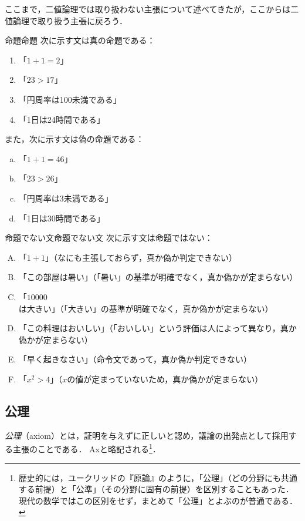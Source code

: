 ここまで，二値論理では取り扱わない主張について述べてきたが，ここからは二値論理で取り扱う主張に戻ろう．

\begin{example}{命題}{命題}
次に示す文は真の命題である：
\begin{enumerate}[(1)]
\item 「$1+1=2$」
\item 「$23 > 17$」
\item 「円周率は100未満である」
\item 「1日は24時間である」
\end{enumerate}
また，次に示す文は偽の命題である：
\begin{enumerate}[(a)]
\item 「$1+1=46$」
\item 「$23>26$」
\item 「円周率は3未満である」
\item 「1日は30時間である」
\end{enumerate}
\end{example}

\begin{example}{命題でない文}{命題でない文}
次に示す文は命題ではない：
\begin{enumerate}[(A)]
\item 「$1+1$」（なにも主張しておらず，真か偽か判定できない）
\item 「この部屋は暑い」（「暑い」の基準が明確でなく，真か偽かが定まらない）
\item 「$10000$は大きい」（「大きい」の基準が明確でなく，真か偽かが定まらない）
\item 「この料理はおいしい」（「おいしい」という評価は人によって異なり，真か偽かが定まらない）
\item 「早く起きなさい」（命令文であって，真か偽か判定できない）
\item 「$x^2 > 4$」（$x$の値が定まっていないため，真か偽かが定まらない）\label{enu:命題でない文4}
\end{enumerate}
\end{example}


\subsection{公理}

\emph{公理}（axiom）とは，証明を与えずに正しいと認め，議論の出発点として採用する主張のことである．
Axと略記される\footnote{歴史的には，ユークリッドの『原論』のように，「公理」（どの分野にも共通する前提）と「公準」（その分野に固有の前提）を区別することもあった．現代の数学ではこの区別をせず，まとめて「公理」とよぶのが普通である．}．

